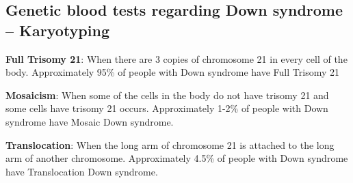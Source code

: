 \subsection{Genetic blood tests regarding Down syndrome – Karyotyping}

\textbf{Full Trisomy 21}: When there are 3 copies of chromosome 21 in every cell of the body.  Approximately 95\% of people with Down syndrome have Full Trisomy 21

\textbf{Mosaicism}: When some of the cells in the body do not have trisomy 21 and some cells have trisomy 21 occurs. Approximately 1-2\% of people with Down syndrome have Mosaic Down syndrome.
 
\textbf{Translocation}: When the long arm of chromosome 21 is attached to the long arm of another chromosome. Approximately 4.5\% of people with Down syndrome have Translocation Down syndrome. 
